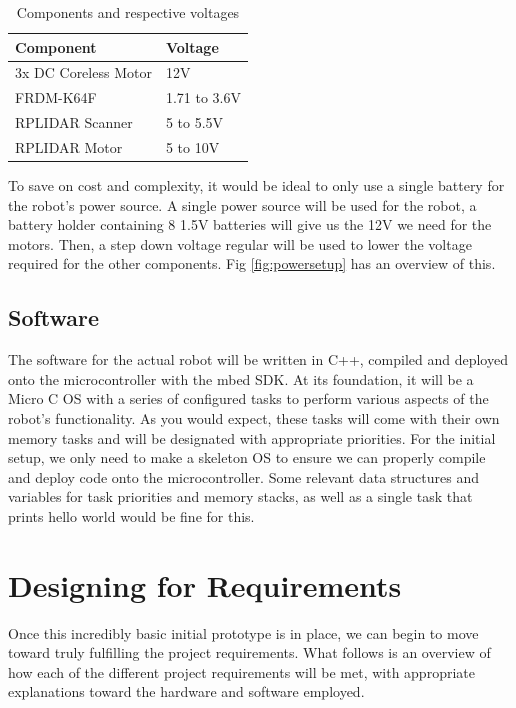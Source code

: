 				\begin{table}[h!]
					\centering
					\begin{tabular}{|| l | l ||} 
						\hline
						Component & Voltage \\ [0.5ex] 
						\hline
						3x DC Coreless Motor  & 12V  \\ 
						FRDM-K64F  & 1.71 to 3.6V   \\
						RPLIDAR Scanner  & 5 to 5.5V  \\
						RPLIDAR Motor & 5 to 10V  \\ [1ex] 
						\hline
					\end{tabular}
					\caption{Components and respective voltages}
					\label{table:1}
				\end{table}
				
				To save on cost and complexity, it would be ideal to only use a single battery for the robot's power source. A single power source will be used for the robot, a battery holder containing 8 1.5V batteries will give us the 12V we need for the motors. Then, a step down voltage regular will be used to lower the voltage required for the other components. Fig \ref{fig:powersetup} has an overview of this.
			
			\subsection{Software}
			The software for the actual robot will be written in C++, compiled and deployed onto the microcontroller with the mbed SDK. At its foundation, it will be a Micro C OS with a series of configured tasks to perform various aspects of the robot's functionality. As you would expect, these tasks will come with their own memory tasks and will be designated with appropriate priorities. For the initial setup, we only need to make a skeleton OS to ensure we can properly compile and deploy code onto the microcontroller. Some relevant data structures and variables for task priorities and memory stacks, as well as a single task that prints hello world would be fine for this.
		
		\section{Designing for Requirements}
		Once this incredibly basic initial prototype is in place, we can begin to move toward truly fulfilling the project requirements. What follows is an overview of how each of the different project requirements will be met, with appropriate explanations toward the hardware and software employed.
		
